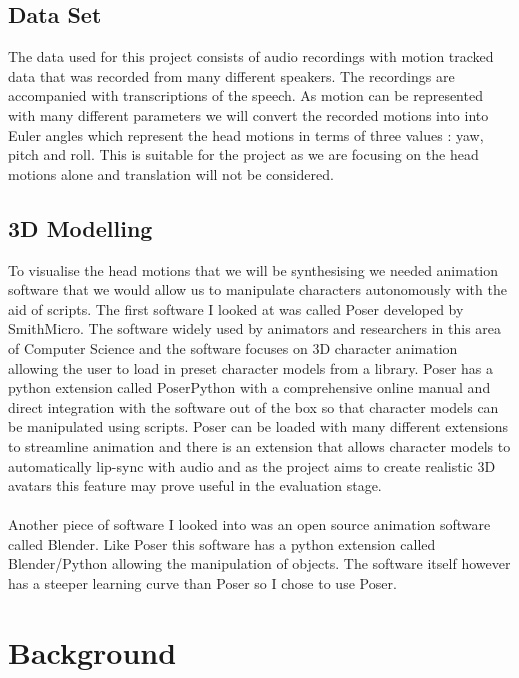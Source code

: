 \documentclass[bsc,frontabs,twoside,singlespacing,parskip]{infthesis}
\begin{document}
\section{Data Set}
The data used for this project consists of audio recordings with motion tracked data that was recorded from many different speakers. The recordings are accompanied with transcriptions of the speech. As motion can be represented with many different parameters we will convert the recorded motions into into Euler angles which represent the head motions in terms of three values : yaw, pitch and roll. This is suitable for the project as we are focusing on the head motions alone and translation will not be considered.
\section{3D Modelling}
To visualise the head motions that we will be synthesising we needed animation software that we would allow us to manipulate characters autonomously with the aid of scripts. The first software I looked at was called Poser developed by SmithMicro. The software widely used by animators and researchers in this area of Computer Science and the software focuses on 3D character animation allowing the user to load in preset character models from a library. Poser has a python extension called PoserPython with a comprehensive online manual and direct integration with the software out of the box so that character models can be manipulated using scripts. Poser can be loaded with many different extensions to streamline animation and there is an extension that allows character models to automatically lip-sync with audio and as the project aims to create realistic 3D avatars this feature may prove useful in the evaluation stage.
\\
\\
Another piece of software I looked into was an open source animation software called Blender. Like Poser this software has a python extension called Blender/Python allowing the manipulation of objects. The software itself however has a steeper learning curve than Poser so I chose to use Poser.

\chapter{Background}
\end{document}
